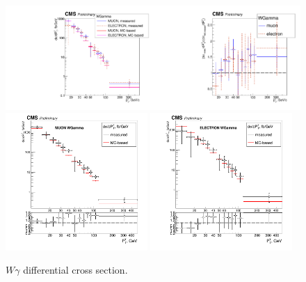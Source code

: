  
\begin{figure}[htb]
  \begin{center}
   \includegraphics[width=0.5\textwidth]{../figs/figs_v11/ChannelsMERGED_WGamma/CrossSection/compareCSWGamma.pdf}\includegraphics[width=0.5\textwidth]{../figs/figs_v11/ChannelsMERGED_WGamma/CrossSection/compareCSratioTheoryWGamma.pdf}
      \includegraphics[width=0.48\textwidth]{../figs/figs_v11/MUON_WGamma/CrossSection/c_CS_MUON_WGamma_UNblind.png} \includegraphics[width=0.48\textwidth]{../figs/figs_v11/ELECTRON_WGamma/CrossSection/c_CS_ELECTRON_WGamma_UNblind.png}
  \caption{$W\gamma$ differential cross section. }
  \label{fig:CS_Wg}
 \end{center}
\end{figure}



